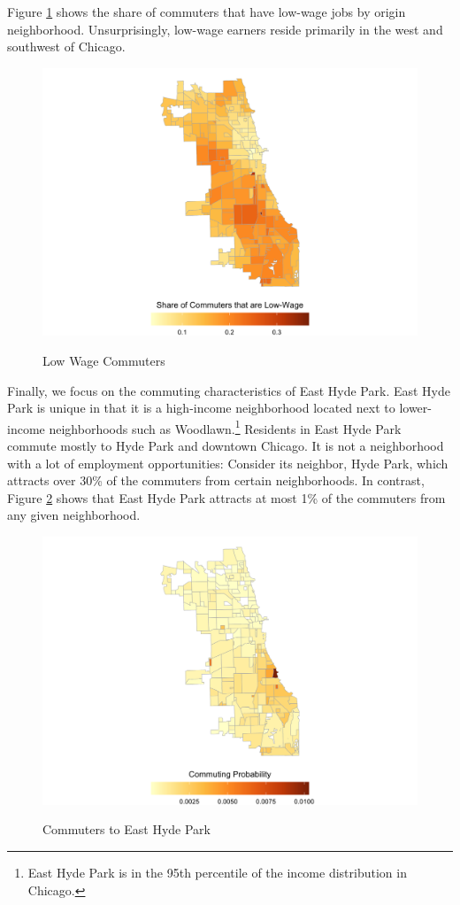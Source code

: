 \documentclass[12pt]{article}
\begin{document}
Figure \ref{fig:lowwage_commute} shows the share of commuters that have low-wage jobs by origin neighborhood. Unsurprisingly, low-wage earners reside primarily in the west and southwest of Chicago. 
\begin{figure}[h!]
    \centering
    \caption{Low Wage Commuters}
    \includegraphics[width=\linewidth]{Pset1/code/lodes_diagnostics_files/figure-html/fig-sharelowtypebyhome-1.png}
    \label{fig:lowwage_commute}
\end{figure}
Finally, we focus on the commuting characteristics of East Hyde Park. East Hyde Park is unique in that it is a high-income neighborhood located next to lower-income neighborhoods such as Woodlawn.\footnote{East Hyde Park is in the 95th percentile of the income distribution in Chicago.} Residents in East Hyde Park commute mostly to Hyde Park and downtown Chicago. It is not a neighborhood with a lot of employment opportunities: Consider its neighbor, Hyde Park, which attracts over 30\% of the commuters from certain neighborhoods. In contrast, Figure \ref{fig:ehp} shows that East Hyde Park attracts at most 1\% of the commuters from any given neighborhood. 
\begin{figure}[h!]
    \centering
    \caption{Commuters to East Hyde Park}
    \includegraphics[width=\linewidth]{Pset1/code/lodes_diagnostics_files/figure-html/unnamed-chunk-12-1.png}
    \label{fig:ehp}
\end{figure}
\end{document}
